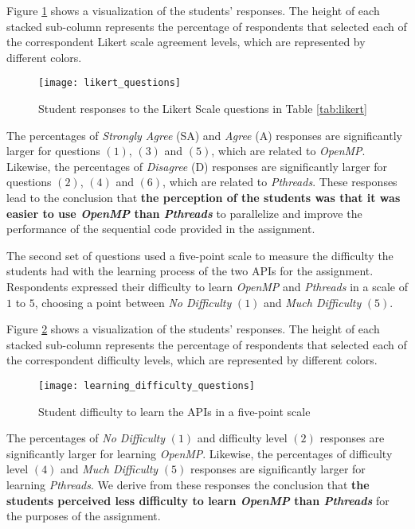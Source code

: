 Figure \ref{fig:likert} shows a visualization of the students' responses.  The
height of each stacked sub-column represents the percentage of respondents that
selected each of the correspondent Likert scale agreement levels, which are
represented by different colors.

\begin{figure}[htpb]
    \centering
    \texttt{[image: likert\_questions]}
    \caption{Student responses to the Likert Scale questions in Table \ref{tab:likert}}
    \label{fig:likert}
\end{figure}

The percentages of \textit{Strongly Agree} (SA) and \textit{Agree} (A)
responses are significantly larger for questions $(1)$, $(3)$ and $(5)$, which
are related to \textit{OpenMP}.  Likewise, the percentages of \textit{Disagree}
(D) responses are significantly larger for questions $(2)$, $(4)$ and $(6)$,
which are related to \textit{Pthreads}. These responses lead to the conclusion
that \textbf{the perception of the students was that it was easier to use
\textit{OpenMP} than \textit{Pthreads}} to parallelize and improve the
performance of the sequential code provided in the assignment.

The second set of questions used a five-point scale to measure the difficulty
the students had with the learning process of the two APIs for the assignment.
Respondents expressed their difficulty to learn \textit{OpenMP} and
\textit{Pthreads} in a scale of $1$ to $5$, choosing a point between \textit{No
Difficulty} $(1)$ and \textit{Much Difficulty} $(5)$.

Figure \ref{fig:learning} shows a visualization of the students' responses.
The height of each stacked sub-column represents the percentage of respondents
that selected each of the correspondent difficulty levels, which are
represented by different colors.

\begin{figure}[htpb]
    \centering
    \texttt{[image: learning\_difficulty\_questions]}
    \caption{Student difficulty to learn the APIs in a five-point scale}
    \label{fig:learning}
\end{figure}

The percentages of \textit{No Difficulty} $(1)$ and difficulty level $(2)$
responses are significantly larger for learning \textit{OpenMP}. Likewise, the
percentages of difficulty level $(4)$ and \textit{Much Difficulty} $(5)$
responses are significantly larger for learning \textit{Pthreads}.  We derive
from these responses the conclusion that \textbf{the students perceived less
difficulty to learn \textit{OpenMP} than \textit{Pthreads}} for the purposes of
the assignment.

